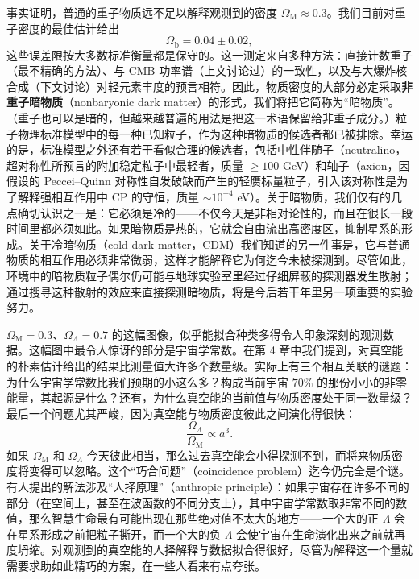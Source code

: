 事实证明，普通的重子物质远不足以解释观测到的密度 $\Omega_{\mathrm{M}}\approx 0.3$。我们目前对重子密度的最佳估计给出
\begin{equation*}
\Omega_{\mathrm{b}} = 0.04\pm 0.02,
\tag{8.164}
\end{equation*}
这些误差限按大多数标准衡量都是保守的。这一测定来自多种方法：直接计数重子（最不精确的方法）、与 CMB 功率谱（上文讨论过）的一致性，以及与大爆炸核合成（下文讨论）对轻元素丰度的预言相符。因此，物质密度的大部分必定采取\textbf{非重子暗物质}（nonbaryonic dark matter）的形式，我们将把它简称为“暗物质”。（重子也可以是暗的，但越来越普遍的用法是把这一术语保留给非重子成分。）粒子物理标准模型中的每一种已知粒子，作为这种暗物质的候选者都已被排除。幸运的是，标准模型之外还有若干看似合理的候选者，包括中性伴随子（neutralino，超对称性所预言的附加稳定粒子中最轻者，质量 $\geq 100$ GeV）和轴子（axion，因假设的 Peccei--Quinn 对称性自发破缺而产生的轻赝标量粒子，引入该对称性是为了解释强相互作用中 CP 的守恒，质量 $\sim 10^{-4}$ eV）。关于暗物质，我们仅有的几点确切认识之一是：它必须是冷的——不仅今天是非相对论性的，而且在很长一段时间里都必须如此。如果暗物质是热的，它就会自由流出高密度区，抑制星系的形成。关于冷暗物质（cold dark matter，CDM）我们知道的另一件事是，它与普通物质的相互作用必须非常微弱，这样才能解释它为何迄今未被探测到。尽管如此，环境中的暗物质粒子偶尔仍可能与地球实验室里经过仔细屏蔽的探测器发生散射；通过搜寻这种散射的效应来直接探测暗物质，将是今后若干年里另一项重要的实验努力。

$\Omega_{\mathrm{M}}=0.3$、$\Omega_{\Lambda}=0.7$ 的这幅图像，似乎能拟合种类多得令人印象深刻的观测数据。这幅图中最令人惊讶的部分是宇宙学常数。在第 4 章中我们提到，对真空能的朴素估计给出的结果比测量值大许多个数量级。实际上有三个相互关联的谜题：为什么宇宙学常数比我们预期的小这么多？构成当前宇宙 $70\%$ 的那份小小的非零能量，其起源是什么？还有，为什么真空能的当前值与物质密度处于同一数量级？最后一个问题尤其严峻，因为真空能与物质密度彼此之间演化得很快：
\begin{equation*}
\frac{\Omega_{\Lambda}}{\Omega_{\mathrm{M}}} \propto a^{3}.
\tag{8.165}
\end{equation*}
如果 $\Omega_{\mathrm{M}}$ 和 $\Omega_{\Lambda}$ 今天彼此相当，那么过去真空能会小得探测不到，而将来物质密度将变得可以忽略。这个“巧合问题”（coincidence problem）迄今仍完全是个谜。有人提出的解法涉及“人择原理”（anthropic principle）：如果宇宙存在许多不同的部分（在空间上，甚至在波函数的不同分支上），其中宇宙学常数取非常不同的数值，那么智慧生命最有可能出现在那些绝对值不太大的地方——一个大的正 $\Lambda$ 会在星系形成之前把粒子撕开，而一个大的负 $\Lambda$ 会使宇宙在生命演化出来之前就再度坍缩。对观测到的真空能的人择解释与数据拟合得很好，尽管为解释这一个量就需要求助如此精巧的方案，在一些人看来有点夸张。

